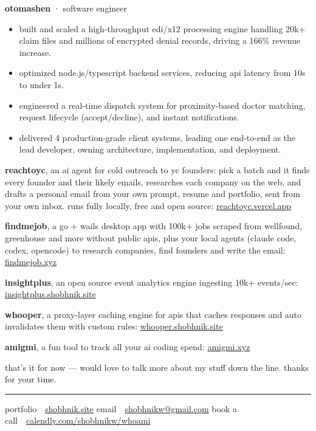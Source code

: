 \documentclass[10pt,a4paper]{article}
\newcommand{\heading}[1]{\vspace{4pt}{\color{accent}\footnotesize\bfseries\MakeUppercase{#1}}\par\vspace{-2pt}}
\newcommand{\lnk}[2]{\href{#1}{#2}}
\newcommand{\hr}{{\color{rulegray}\rule{\linewidth}{0.6pt}}}
\begin{document}
\textbf{otomashen} {\color{muted}· software engineer}
\begin{itemize}
\item built and scaled a high-throughput edi/x12 processing engine handling 20k+ claim files and millions of encrypted denial records, driving a 166\% revenue increase.
\item optimized node.js/typescript backend services, reducing api latency from 10s to under 1s.
\item engineered a real-time dispatch system for proximity-based doctor matching, request lifecycle (accept/decline), and instant notifications.
\item delivered 4 production-grade client systems, leading one end-to-end as the lead developer, owning architecture, implementation, and deployment.
\end{itemize}

\heading{things i've built on my own}

\textbf{reachtoyc}, an ai agent for cold outreach to yc founders: pick a batch and it finds every founder and their likely emails, researches each company on the web, and drafts a personal email from your own prompt, resume and portfolio, sent from your own inbox. runs fully locally, free and open source: \lnk{https://reachtoyc.vercel.app}{reachtoyc.vercel.app}

\textbf{findmejob}, a go + wails desktop app with 100k+ jobs scraped from wellfound, greenhouse and more without public apis, plus your local agents (claude code, codex, opencode) to research companies, find founders and write the email: \lnk{https://findmejob.xyz}{findmejob.xyz}

\textbf{insightplus}, an open source event analytics engine ingesting 10k+ events/sec: \lnk{https://insightplus.shobhnik.site}{insightplus.shobhnik.site}

\textbf{whooper}, a proxy-layer caching engine for apis that caches responses and auto invalidates them with custom rules: \lnk{https://whooper.shobhnik.site}{whooper.shobhnik.site}

\textbf{amigmi}, a fun tool to track all your ai coding spend: \lnk{https://amigmi.xyz}{amigmi.xyz}

that's it for now --- would love to talk more about my stuff down the line. thanks for your time.

\vspace{2pt}
\hr
\vspace{-4pt}

{\color{muted}portfolio}\ \ \lnk{https://shobhnik.site}{shobhnik.site}\qquad
{\color{muted}email}\ \ \lnk{mailto:shobhnikw@gmail.com}{shobhnikw@gmail.com}\qquad
{\color{muted}book a call}\ \ \lnk{https://calendly.com/shobhnikw/whoami}{calendly.com/shobhnikw/whoami}
\end{document}

